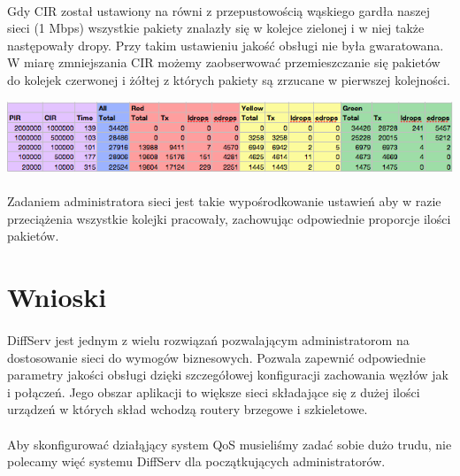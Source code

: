 \documentclass[a4paper]{article}
\begin{document}
\paragraph{}
Gdy CIR został ustawiony na równi z przepustowością wąskiego gardła naszej sieci (1 Mbps) wszystkie pakiety znalazły się w kolejce zielonej i w niej także następowały dropy. Przy takim ustawieniu jakość obsługi nie była gwaratowana.
W miarę zmniejszania CIR możemy zaobserwować przemieszczanie się pakietów do kolejek czerwonej i żółtej z których pakiety są zrzucane w pierwszej kolejności.

\includegraphics[width=150mm]{images/punkt_3_tabela.png}

\paragraph{}
Zadaniem administratora sieci jest takie wypośrodkowanie ustawień aby w razie przeciążenia wszystkie kolejki pracowały, zachowując odpowiednie proporcje ilości pakietów.

\section{Wnioski}

\paragraph{}
DiffServ jest jednym z wielu rozwiązań pozwalającym administratorom na dostosowanie sieci do wymogów biznesowych. Pozwala zapewnić odpowiednie parametry jakości obsługi dzięki szczegółowej konfiguracji zachowania węzłów jak i połączeń. Jego obszar aplikacji to większe sieci składające się z dużej ilości urządzeń w których skład wchodzą routery brzegowe i szkieletowe.

\paragraph{}
Aby skonfigurować działąjący system QoS musieliśmy zadać sobie dużo trudu, nie polecamy więć systemu DiffServ dla początkujących administratorów.
\end{document}
